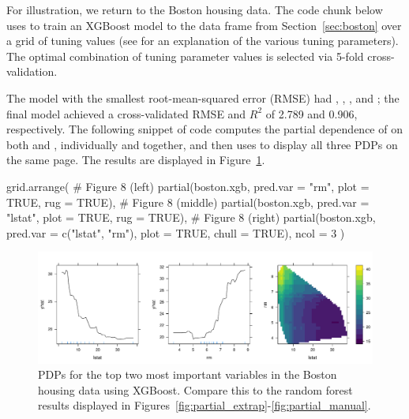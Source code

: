For illustration, we return to the Boston housing data. The code chunk below uses  to train an XGBoost model to the  data frame from Section~\ref{sec:boston} over a grid of tuning values (see  for an explanation of the various tuning parameters). The optimal combination of tuning parameter values is selected via 5-fold cross-validation.
The model with the smallest root-mean-squared error (RMSE) had , , , and ; the final model achieved a cross-validated RMSE and $R^2$ of 2.789 and 0.906, respectively. The following snippet of code computes the partial dependence of  on both  and , individually and together, and then uses  to display all three PDPs on the same page. The results are displayed in Figure~\ref{fig:boston_xgb}.
\begin{example}
grid.arrange(
  # Figure 8 (left)
  partial(boston.xgb, pred.var = "rm", plot = TRUE, rug = TRUE),
  # Figure 8 (middle)
  partial(boston.xgb, pred.var = "lstat", plot = TRUE, rug = TRUE),
  # Figure 8 (right)
  partial(boston.xgb, pred.var = c("lstat", "rm"), plot = TRUE, chull = TRUE),
  ncol = 3
)
\end{example}

\begin{figure}[!htbp]
  \centering
  \includegraphics[width=1.0\linewidth]{boston_xgb}
  \caption{PDPs for the top two most important variables in the Boston housing data using XGBoost. Compare this to the random forest results displayed in Figures~\ref{fig:partial_extrap}-\ref{fig:partial_manual}.}
  \label{fig:boston_xgb}
\end{figure}

